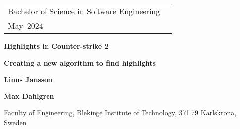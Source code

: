 \documentclass[a4paper,twoside]{bth}
\newcommand{\thesisDegree}{Bachelor of Science in Software Engineering}
\newcommand{\thesisMonth}{May}
\newcommand{\thesisYear}{2024}
\newcommand{\faculty}{Engineering}
\newcommand{\thesisTitle}{Highlights in Counter-strike 2}
\newcommand{\thesisSubtitle}{Creating a new algorithm to find highlights}
\newcommand{\authorFirst}{Linus Jansson}
\newcommand{\authorSecond}{Max Dahlgren}
\begin{document}
\pagestyle{plain}

{\pagestyle{empty}
\changepage{3cm}{1cm}{-0.5cm}{-0.5cm}{}{-1.5cm}{}{}{}
\noindent
\begin{tabular}{@{}p{} p{}}
\thesisDegree & \hfill\multirow{3}{*}{\bthcsnotextlogo{3cm}} \\
\thesisMonth \ \thesisYear & \\
\end{tabular}

\center
\vspace {7.5cm}
{\Huge\textbf{\thesisTitle}}

\vspace {0.5cm}
{\Large\textbf{\thesisSubtitle}}

\vspace{2cm}
{\Large\textbf{\authorFirst}}

\vspace{0.3cm}
{\Large\textbf{\authorSecond}}

\vspace*{\fill}

\noindent\makebox[\linewidth]{\rule{\textwidth}{1pt}} 
Faculty of \faculty, Blekinge Institute of Technology, 371 79 Karlskrona, Sweden

\clearpage
} %
\end{document}
